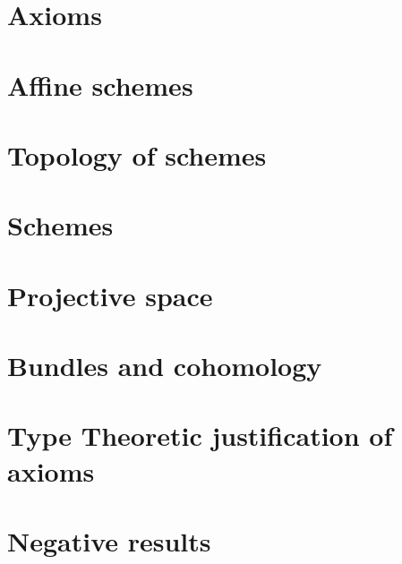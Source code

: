 \documentclass{../util/zariski}
\begin{document}
\section{Axioms}


\section{Affine schemes}


\section{Topology of schemes}
\label{topology-of-schemes}


\section{Schemes}


\section{Projective space}


\section{Bundles and cohomology}


\section{Type Theoretic justification of axioms}


\appendix

\section{Negative results}


\printindex

\printbibliography
\end{document}
